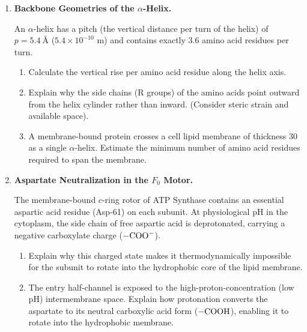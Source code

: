 \documentclass[12pt, a4paper]{book}
\begin{document}
\begin{problembox}
\begin{enumerate}[label=\textbf{P\arabic*.}]
  \item \textbf{Backbone Geometries of the $\alpha$-Helix.}
  
        An $\alpha$-helix has a pitch (the vertical distance per turn of the helix) of $p = \SI{5.4}{\text{\AA}}$ ($5.4 \times 10^{-10}$ m) and contains exactly 3.6 amino acid residues per turn.
        \begin{enumerate}[label=(\alph*)]
          \item Calculate the vertical rise per amino acid residue along the helix axis.
          \item Explain why the side chains (R groups) of the amino acids point outward from the helix cylinder rather than inward. (Consider steric strain and available space).
          \item A membrane-bound protein crosses a cell lipid membrane of thickness \SI{30}{\text{\AA}} as a single $\alpha$-helix. Estimate the minimum number of amino acid residues required to span the membrane.
        \end{enumerate}

  \item \textbf{Aspartate Neutralization in the $F_0$ Motor.}
  
        The membrane-bound $c$-ring rotor of ATP Synthase contains an essential aspartic acid residue (Asp-61) on each subunit.
        At physiological pH in the cytoplasm, the side chain of free aspartic acid is deprotonated, carrying a negative carboxylate charge ($-\ce{COO-}$).
        \begin{enumerate}[label=(\alph*)]
          \item Explain why this charged state makes it thermodynamically impossible for the subunit to rotate into the hydrophobic core of the lipid membrane.
          \item The entry half-channel is exposed to the high-proton-concentration (low pH) intermembrane space.
                Explain how protonation converts the aspartate to its neutral carboxylic acid form ($-\ce{COOH}$), enabling it to rotate into the hydrophobic membrane.
        \end{enumerate}
\end{enumerate}
\end{problembox}

\newpage

\end{document}
